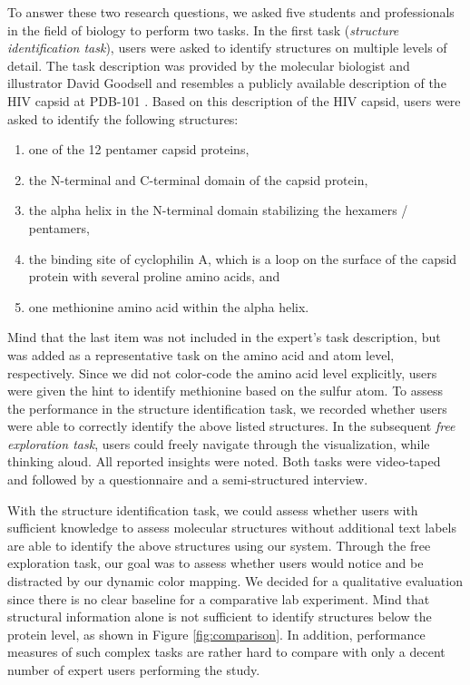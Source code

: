 \documentclass{egpubl}
\begin{document}
	To answer these two research questions, we asked five students and professionals in the field of biology to perform two tasks. 
	In the first task (\emph{structure identification task}), users were asked to identify structures on multiple levels of detail. 
	The task description was provided by the molecular biologist and illustrator David Goodsell and resembles a publicly available description of the HIV capsid at PDB-101 \cite{goodsell2016}.
	Based on this description of the HIV capsid, users were asked to identify the following structures: 
	\begin{enumerate}
		\itemsep0em 
		\item one of the 12 pentamer capsid proteins, 
		\item the N-terminal and C-terminal domain of the capsid protein, 
		\item the alpha helix in the N-terminal domain stabilizing the hexamers / pentamers, 
		\item the binding site of cyclophilin A, which is a loop on the surface of the capsid protein with several proline amino acids, and
		\item one methionine amino acid within the alpha helix.
	\end{enumerate}
	Mind that the last item was not included in the expert's task description, but was added as a representative task on the amino acid and atom level, respectively. 
	Since we did not color-code the amino acid level explicitly, users were given the hint to identify methionine based on the sulfur atom. 
	To assess the performance in the structure identification task, we recorded whether users were able to correctly identify the above listed structures. 
	In the subsequent \emph{free exploration task}, users could freely navigate through the visualization, while thinking aloud. 
	All reported insights were noted. 
	Both tasks were video-taped and followed by a questionnaire and a semi-structured interview. 
	
	With the structure identification task, we could assess whether users with sufficient knowledge to assess molecular structures without additional text labels are able to identify the above structures using our system. 
	Through the free exploration task, our goal was to assess whether users would notice and be distracted by our dynamic color mapping. 
	We decided for a qualitative evaluation since there is no clear baseline for a comparative lab experiment. 
	Mind that structural information alone is not sufficient to identify structures below the protein level, as shown in Figure \ref{fig:comparison}. 
	In addition, performance measures of such complex tasks are rather hard to compare with only a decent number of expert users performing the study. 
	
\end{document}
